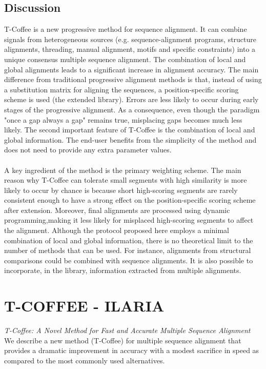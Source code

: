 \section{Discussion}
T-Coffee is a new progressive method for sequence alignment. It can combine signals from heterogeneous sources (e.g. sequence-alignment programs, structure alignments, threading, manual alignment, motifs and specific constraints) into a unique consensus multiple sequence alignment.
The combination of local and global alignments leads to a significant increase in alignment accuracy.
The main difference from traditional progressive alignment methods is that, instead of using a substitution matrix for aligning the sequences, a position-specific scoring scheme is used (the extended library). Errors are less likely to occur during early stages of the progressive alignment. As a consequence, even though the paradigm "once a gap always a gap" remains true, misplacing gaps becomes much less likely.
The second important feature of T-Coffee is the combination of local and global information. The end-user benefits from the simplicity of the method and does not need to provide any extra parameter values.
\\
\\
\noindent
A key ingredient of the method is the primary weighting scheme.  The main reason why T-Coffee can tolerate small segments with high similarity is more likely to occur by chance is because short high-scoring segments are rarely consistent enough to have a strong effect on the position-specific scoring scheme after extension.
Moreover, final alignments are processed using dynamic programming,making it less likely for misplaced high-scoring segments to affect the alignment.
Although the protocol proposed here employs a minimal combination of local and global information, there is no theoretical limit to the number of methods that can be used. For instance, alignments from structural comparisons could be combined with sequence alignments. It is also possible to incorporate, in the library, information extracted from multiple alignments.


\graphicspath{{chapters/11/}}
\chapter{T-COFFEE - ILARIA}
\emph{T-Coffee: A Novel Method for Fast and Accurate Multiple Sequence Alignment}
We describe a new method (T-Coffee) for multiple sequence alignment that provides a dramatic improvement in accuracy with a modest sacrifice in speed as compared to the most commonly used alternatives.
